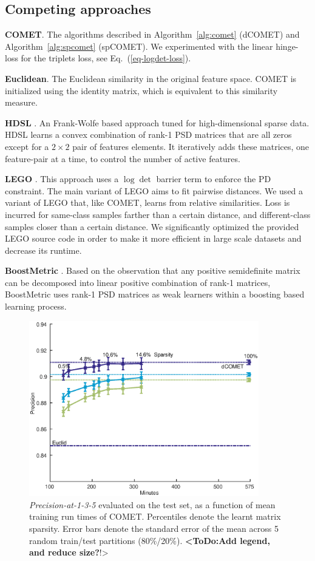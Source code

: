 \documentclass[twoside,11pt]{article}
\newcommand\todo[1]{\textbf{<ToDo:#1}!>}
\renewcommand{\eqref}[1]{Eq.~(\ref{#1})}
\begin{document}
\subsection{Competing approaches}

\textbf{COMET}. The algorithms described in Algorithm~\ref{alg:comet} (dCOMET) and Algorithm~\ref{alg:spcomet} (spCOMET). We experimented with the linear hinge-loss for the triplets loss, see \eqref{eq-logdet-loss}.

\noindent\textbf{Euclidean}. The Euclidean similarity in the original feature space. COMET is initialized using the identity matrix, which is equivalent to this similarity measure.

\noindent\textbf{HDSL} \citep{hdsl}. An Frank-Wolfe based approach tuned for high-dimensional sparse data. HDSL learns a convex combination of rank-1 PSD matrices that are all zeros except for a $2\times2$ pair of features elements. It iteratively adds these matrices, one feature-pair at a time, to control the number of active features.

\noindent\textbf{LEGO} \citep{lego}. This approach uses a $\log \det$ barrier term to enforce the PD constraint. The main variant of LEGO aims to fit pairwise distances. We used a variant of LEGO that, like COMET, learns from relative similarities. Loss is incurred for same-class samples farther than a certain distance, and different-class samples closer than a certain distance. We significantly optimized the provided LEGO source code in order to make it more efficient in large scale datasets and decrease its runtime.

\noindent\textbf{BoostMetric} \citep{boost}. Based on the observation that any positive semidefinite matrix can be decomposed into linear positive combination of rank-1 matrices, BoostMetric uses rank-1 PSD matrices as weak learners within a boosting based learning process.

\begin{figure}[h]
\centering
\includegraphics[width=10cm]{sCOMET_precision_vs_runtime}
\caption{\textit{Precision-at-1-3-5} evaluated on the test set, as a function of mean training run times of COMET. Percentiles denote the learnt matrix sparsity. Error bars denote the standard error of the mean across 5 random train/test partitions (80\%/20\%). \todo{Add legend, and reduce size?}}\label{spCometPrecTime}
\end{figure}
\end{document}
